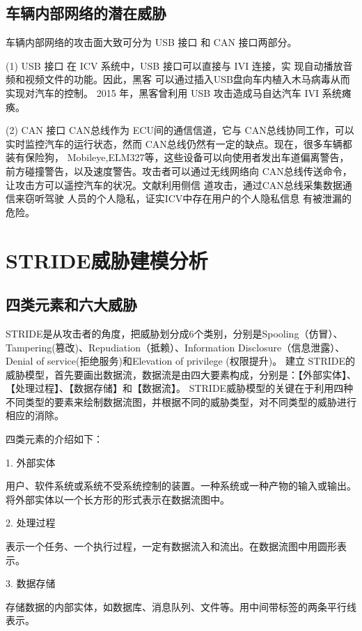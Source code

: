 \subsection{车辆内部网络的潜在威胁}
车辆内部网络的攻击面大致可分为 USB 接口
和 CAN 接口两部分。

(1) USB 接口
在 ICV 系统中，USB 接口可以直接与 IVI 连接，实
现自动播放音频和视频文件的功能。因此，黑客
可以通过插入USB盘向车内植入木马病毒从而实现对汽车的控制。
2015 年，黑客曾利用 USB 攻击造成马自达汽车 IVI
系统瘫痪。

(2) CAN 接口
CAN总线作为 ECU间的通信信道，它与 CAN总线协同工作，可以实时监控汽车的运行状态，然而 CAN总线仍然有一定的缺点。现在，很多车辆都装有保险狗， Mobileye,ELM327等，这些设备可以向使用者发出车道偏离警告，前方碰撞警告，以及速度警告。攻击者可以通过无线网络向 CAN总线传送命令，让攻击方可以遥控汽车的状况。文献\cite{koscher2010experimental}利用侧信
道攻击，通过CAN总线采集数据通信来窃听驾驶
人员的个人隐私，证实ICV中存在用户的个人隐私信息
有被泄漏的危险。

\section{STRIDE威胁建模分析}

\subsection{四类元素和六大威胁}

STRIDE是从攻击者的角度，把威胁划分成6个类别，分别是Spooling（仿冒）、Tampering(篡改)、Repudiation（抵赖）、Information Disclosure（信息泄露）、Denial of service(拒绝服务)和Elevation of privilege (权限提升)。
建立 STRIDE的威胁模型，首先要画出数据流，数据流是由四大要素构成，分别是：【外部实体】、【处理过程】、【数据存储】和【数据流】。
STRIDE威胁模型的关键在于利用四种不同类型的要素来绘制数据流图，并根据不同的威胁类型，对不同类型的威胁进行相应的消除。


四类元素的介绍如下：

1.  外部实体

用户、软件系统或系统不受系统控制的装置。一种系统或一种产物的输入或输出。将外部实体以一个长方形的形式表示在数据流图中。

2.  处理过程

表示一个任务、一个执行过程，一定有数据流入和流出。在数据流图中用圆形表示。

3.  数据存储

存储数据的内部实体，如数据库、消息队列、文件等。用中间带标签的两条平行线表示。

